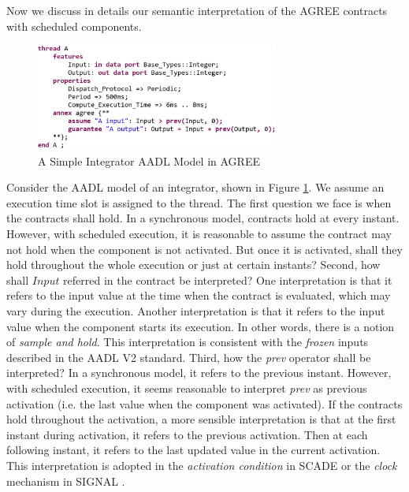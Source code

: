 Now we discuss in details our semantic interpretation of the AGREE contracts with scheduled components.
\begin{figure}[ht!]
\centering
\includegraphics[width=80mm]{pre.jpg}
\caption{A Simple Integrator AADL Model in AGREE\label{integratorFig}}
\end{figure}

Consider the AADL model of an integrator, shown in Figure \ref{integratorFig}. We assume an execution time slot is assigned to the thread.  
The first question we face is when the contracts shall hold. In a synchronous model, contracts hold at every instant. However, with scheduled execution, it is reasonable to assume the contract may not hold when the component is not activated. But once it is activated, shall they hold throughout the whole execution or just at certain instants? Second, how shall $Input$ referred in the contract be interpreted? One interpretation is that it refers to the input value at the time when the contract is evaluated, which may vary during the execution. Another interpretation is that it refers to the input value when the component starts its execution. In other words, there is a notion of \emph{sample and hold}. This interpretation is consistent with the \emph{frozen} inputs described in the AADL V2 standard. Third, how the \emph{prev} operator shall be interpreted? In a synchronous model, it refers to the previous instant. However, with scheduled execution, it seems reasonable to interpret \emph{prev} as previous activation (i.e. the last value when the component was activated). If the contracts hold throughout the activation, a more sensible interpretation is that at the first instant during activation, it refers to the previous activation. Then at each following instant, it refers to the last updated value in the current activation. This interpretation is adopted in the \emph{activation condition} in SCADE \cite{scade} or the \emph{clock} mechanism in SIGNAL \cite{signal}.

